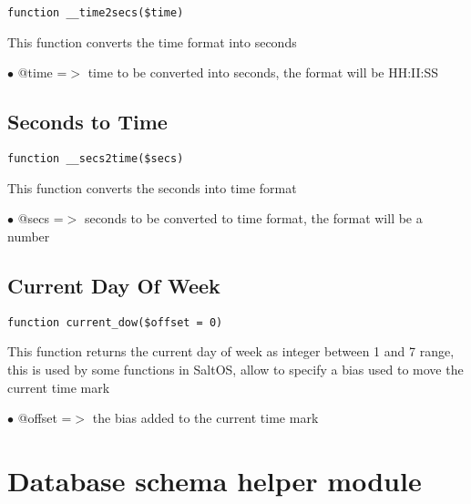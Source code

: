 \documentclass[a4paper]{book}
\begin{document}
\begin{lstlisting}
function __time2secs($time)
\end{lstlisting}

This function converts the time format into seconds

\begin{compactitem}
\item[\color{myblue}$\bullet$] @time =$>$ time to be converted into seconds, the format will be HH:II:SS
\end{compactitem}

\hypertarget{toc79}{}
\subsection{Seconds to Time}

\begin{lstlisting}
function __secs2time($secs)
\end{lstlisting}

This function converts the seconds into time format

\begin{compactitem}
\item[\color{myblue}$\bullet$] @secs =$>$ seconds to be converted to time format, the format will be a number
\end{compactitem}

\hypertarget{toc80}{}
\subsection{Current Day Of Week}

\begin{lstlisting}
function current_dow($offset = 0)
\end{lstlisting}

This function returns the current day of week as integer between 1 and 7
range, this is used by some functions in SaltOS, allow to specify a bias
used to move the current time mark

\begin{compactitem}
\item[\color{myblue}$\bullet$] @offset =$>$ the bias added to the current time mark
\end{compactitem}

\hypertarget{toc81}{}
\section{Database schema helper module}
\end{document}
